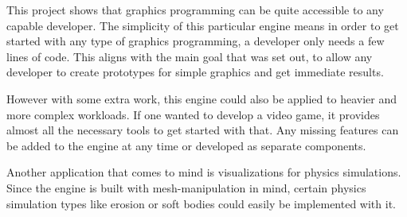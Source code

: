 
This project shows that graphics programming can be quite accessible to any capable developer.
The simplicity of this particular engine means in order to get started with any type of graphics programming,
a developer only needs a few lines of code.
This aligns with the main goal that was set out,
to allow any developer to create prototypes for simple graphics and get immediate results.

However with some extra work,
this engine could also be applied to heavier and more complex workloads.
If one wanted to develop a video game,
it provides almost all the necessary tools to get started with that.
Any missing features can be added to the engine at any time or developed as separate components.

Another application that comes to mind is visualizations for physics simulations.
Since the engine is built with mesh-manipulation in mind,
certain physics simulation types like erosion or soft bodies could easily be implemented with it.
